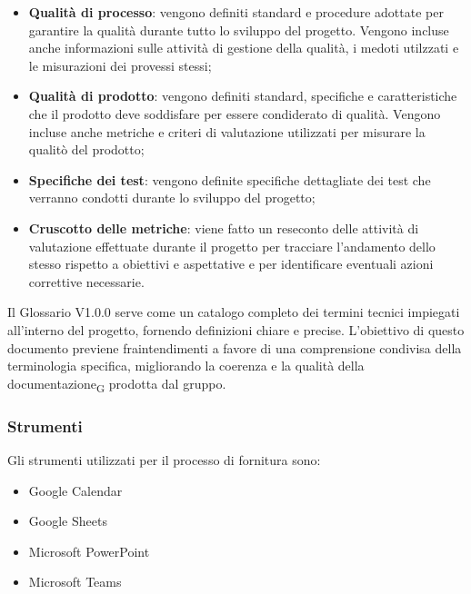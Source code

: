 \begin{itemize}
    \item \textbf{Qualità di processo}: vengono definiti standard e procedure adottate per garantire la qualità durante tutto lo sviluppo del progetto. Vengono incluse anche informazioni sulle attività di gestione della qualità, i medoti utilzzati e le misurazioni dei provessi stessi;
    \item \textbf{Qualità di prodotto}: vengono definiti standard, specifiche e caratteristiche che il prodotto deve soddisfare per essere condiderato di qualità. Vengono incluse anche metriche e criteri di valutazione utilizzati per misurare la qualitò del prodotto;
    \item \textbf{Specifiche dei test}: vengono definite specifiche dettagliate dei test che verranno condotti durante lo sviluppo del progetto;
    \item \textbf{Cruscotto delle metriche}: viene fatto un reseconto delle attività di valutazione effettuate durante il progetto per tracciare l'andamento dello stesso rispetto a obiettivi e aspettative e per identificare eventuali azioni correttive necessarie.
\end{itemize}

Il Glossario V1.0.0 serve come un catalogo completo dei termini tecnici impiegati all'interno del progetto, fornendo definizioni chiare e precise. L'obiettivo di questo documento previene fraintendimenti a favore di una comprensione condivisa della terminologia specifica, migliorando la coerenza e la qualità della documentazione\textsubscript{G} prodotta dal gruppo.

\subsubsection{Strumenti}
Gli strumenti utilizzati per il processo di fornitura sono:
\begin{itemize}
    \item Google Calendar
    \item Google Sheets
    \item Microsoft PowerPoint
    \item Microsoft Teams
\end{itemize}